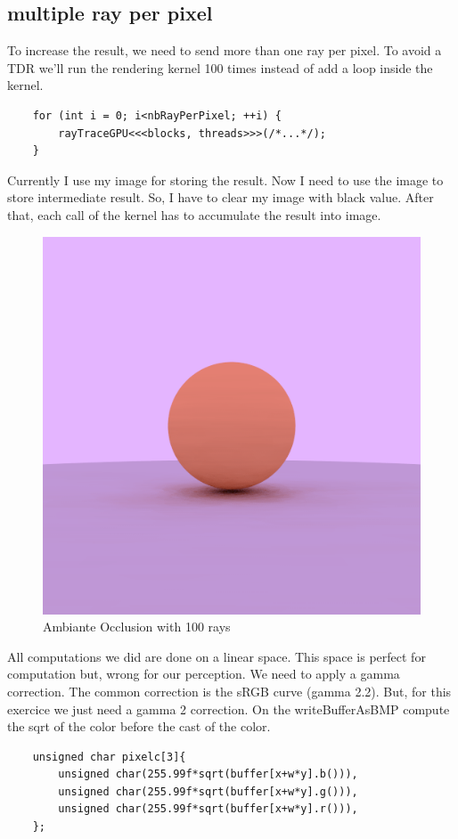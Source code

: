 \documentclass{article}
\begin{document}
\subsection{multiple ray per pixel}
To increase the result, we need to send more than one ray per pixel. To avoid a TDR we'll run the rendering kernel 100 times instead of add a loop inside the kernel.
\begin{lstlisting}
	for (int i = 0; i<nbRayPerPixel; ++i) {
		rayTraceGPU<<<blocks, threads>>>(/*...*/);
	}
\end{lstlisting}

Currently I use my image for storing the result. Now I need to use the image to store intermediate result. So, I have to clear my image with black value. After that, each call of the kernel has to accumulate the result into image.

\begin{figure}[h]
	\centering
	\includegraphics[scale=0.47]{figures/result.png}
	\caption{Ambiante Occlusion with 100 rays}
\end{figure}

All computations we did are done on a linear space. This space is perfect for computation but, wrong for our perception. We need to apply a gamma correction. The common correction is the sRGB curve (gamma 2.2). But, for this exercice we just need a gamma 2 correction. On the writeBufferAsBMP compute the sqrt of the color before the cast of the color.
\begin{lstlisting}
	unsigned char pixelc[3]{
		unsigned char(255.99f*sqrt(buffer[x+w*y].b())),
		unsigned char(255.99f*sqrt(buffer[x+w*y].g())),
		unsigned char(255.99f*sqrt(buffer[x+w*y].r())),
	};
\end{lstlisting}
\end{document}
